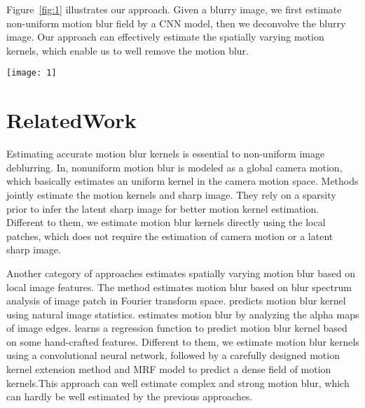 \documentclass[10pt,twocolumn,letterpaper]{article}
\begin{document}
Figure~\ref{fig:1} illustrates our approach. Given a blurry image,
we first estimate non-uniform motion blur field by a CNN
model, then we deconvolve the blurry image. Our approach
can effectively estimate the spatially varying motion kernels,
which enable us to well remove the motion blur.
\begin{figure*}
\centering
\texttt{[image: 1]}
\caption{An example illustrating our approach. Given an image with non-uniform motion blur (left). We first estimate the field of
non-uniform motion blur kernels by a convolutional neural network (middle), then deconvolve the blurred image (right).}
\label{fig:1}
\end{figure*}
\section{RelatedWork}
Estimating accurate motion blur kernels is essential to
non-uniform image deblurring. In\cite{Gupta2010Single}\cite{Hirsch2011Fast}, nonuniform
motion blur is modeled as a global camera motion,
which basically estimates an uniform kernel in the camera
motion space. Methods jointly estimate the
motion kernels and sharp image. They rely on a sparsity
prior to infer the latent sharp image for better motion kernel
estimation. Different to them, we estimate motion blur kernels
directly using the local patches, which does not require
the estimation of camera motion or a latent sharp image.

Another category of approaches estimates spatially
varying motion blur based on local image features. The
method estimates motion blur based on blur spectrum
analysis of image patch in Fourier transform space.\cite{B2006Blind}
predicts motion blur kernel using natural image statistics. estimates motion blur by analyzing the alpha maps of
image edges.\cite{Couzini2013Learning} learns a regression function to predict motion
blur kernel based on some hand-crafted features. Different
to them, we estimate motion blur kernels using a convolutional
neural network, followed by a carefully designed
motion kernel extension method and MRF model to predict a dense field of motion kernels.This approach can well estimate
complex and strong motion blur, which can hardly be
well estimated by the previous approaches.
{\small


}
\end{document}
